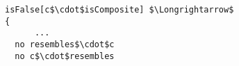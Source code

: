 \lstset{frame=tb, aboveskip=12pt, belowskip=-3pt, breaklines=true, basicstyle=\small\ttfamily, tabsize=2, mathescape=true}
\begin{lstlisting}[caption={facts.als, lines 220-226}, label=alloy:COMPONENT_NO_LEAF_REDEF_RESEMBLANCE, captionpos=b]
isFalse[c$\cdot$isComposite] $\Longrightarrow$
{
      ...
  no resembles$\cdot$c
  no c$\cdot$resembles
\end{lstlisting}